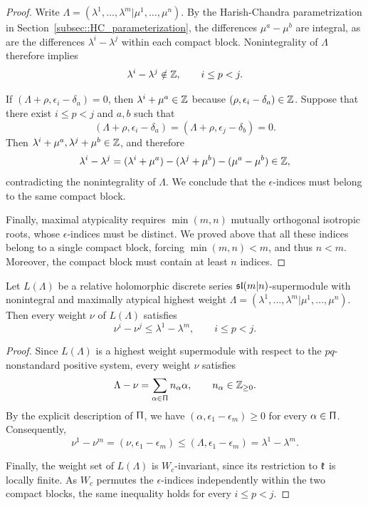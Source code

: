\begin{proof}
Write
$
\Lambda=(\lambda^1,\ldots,\lambda^m\vert\mu^1,\ldots,\mu^n).
$
By the Harish-Chandra parametrization in Section~\ref{subsec::HC_parameterization}, the differences $\mu^a-\mu^b$ are integral, as are the differences $\lambda^i-\lambda^j$ within each compact block. Nonintegrality of $\Lambda$ therefore implies
\[
\lambda^i-\lambda^j\notin\ZZ,
\qquad i\leq p<j.
\]

If
$
(\Lambda+\rho,\epsilon_i-\delta_a)=0
$, then $\lambda^i+\mu^a\in\ZZ$ because $(\rho,\epsilon_i-\delta_a)\in\ZZ$. 
Suppose that there exist $i\leq p<j$ and $a,b$ such that
\[
(\Lambda+\rho,\epsilon_i-\delta_a)
=
(\Lambda+\rho,\epsilon_j-\delta_b)=0.
\]
Then $\lambda^i+\mu^a,\lambda^j+\mu^b\in\ZZ$, and therefore
\[
\lambda^i-\lambda^j
=
(\lambda^i+\mu^a)
-(\lambda^j+\mu^b)
-(\mu^a-\mu^b)
\in\ZZ,
\]
contradicting the nonintegrality of $\Lambda$. We conclude that the $\epsilon$-indices must belong to the same compact block.


Finally, maximal atypicality requires $\min(m,n)$ mutually orthogonal isotropic roots, whose $\epsilon$-indices must be distinct. We proved above that all these indices belong to a single compact block, forcing $\min(m,n)<m$, and thus $n<m$. Moreover, the compact block must contain at least $n$ indices.
\end{proof}


\begin{lemma}\label{lemm::weight_condition_slmn}
Let $L(\Lambda)$ be a relative holomorphic discrete series $\sl(m\vert n)$-supermodule with nonintegral and maximally atypical highest weight
$
\Lambda=(\lambda^1,\ldots,\lambda^m\vert\mu^1,\ldots,\mu^n).
$
Then every weight $\nu$ of $L(\Lambda)$ satisfies
\[
\nu^i-\nu^j\leq\lambda^1-\lambda^m,
\qquad i\leq p<j.
\]
\end{lemma}

\begin{proof}
Since $L(\Lambda)$ is a highest weight supermodule with respect to the $pq$-nonstandard positive system, every weight $\nu$ satisfies
\[
\Lambda-\nu
=
\sum_{\alpha\in\Uppi}n_\alpha\alpha,
\qquad n_\alpha\in\ZZ_{\geq0}.
\]
By the explicit description of $\Uppi$, we have
$
(\alpha,\epsilon_1-\epsilon_m)\geq0
$
for every $\alpha\in\Uppi$. Consequently,
\[
\nu^1-\nu^m
=
(\nu,\epsilon_1-\epsilon_m)
\leq
(\Lambda,\epsilon_1-\epsilon_m)
=
\lambda^1-\lambda^m.
\]

Finally, the weight set of $L(\Lambda)$ is $W_c$-invariant, since its restriction to $\kk$ is locally finite. As $W_c$ permutes the $\epsilon$-indices independently within the two compact blocks, the same inequality holds for every $i\leq p<j$.
\end{proof}



